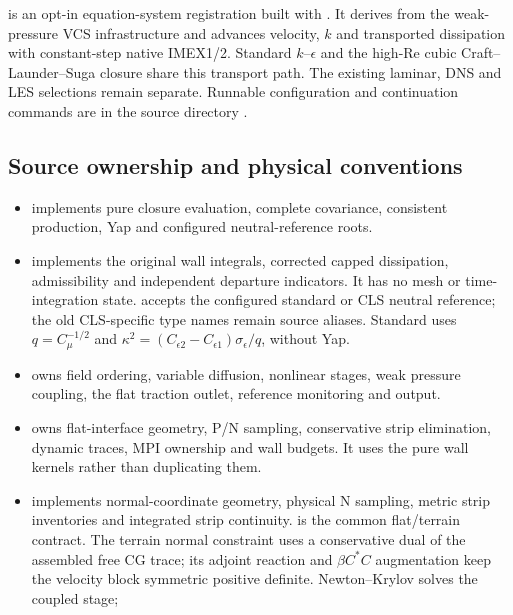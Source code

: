  is an opt-in equation-system registration
built with . It derives from the weak-pressure VCS
infrastructure and advances velocity, $k$ and transported dissipation with
constant-step native IMEX1/2. Standard $k$--$\epsilon$ and the high-Re cubic
Craft--Launder--Suga closure share this transport path. The existing laminar,
DNS and LES selections remain separate. Runnable configuration and continuation
commands are in the source directory
.

\subsection{Source ownership and physical conventions}

\begin{itemize}
\item {} implements pure closure
evaluation, complete covariance, consistent production, Yap and configured
neutral-reference roots.
\item {} implements
the original wall integrals, corrected capped dissipation, admissibility and
independent departure indicators. It has no mesh or time-integration state.
 accepts the configured standard or CLS neutral
reference; the old CLS-specific type names remain source aliases. Standard
uses $q=C_\mu^{-1/2}$ and
$\kappa^2=(C_{\epsilon2}-C_{\epsilon1})\sigma_\epsilon/q$, without Yap.
\item {} owns field ordering, variable
diffusion, nonlinear stages, weak pressure coupling, the flat traction outlet,
reference monitoring and output.
\item {} owns flat-interface geometry, P/N
sampling, conservative strip elimination, dynamic traces, MPI ownership and
wall budgets. It uses the pure wall kernels rather than duplicating them.
\item {} implements normal-coordinate geometry,
physical N sampling, metric strip inventories and integrated strip continuity.
 is the common flat/terrain contract.
The terrain normal constraint uses a conservative dual of the assembled free
CG trace; its adjoint reaction and $\beta C^*C$ augmentation keep the velocity
block symmetric positive definite. Newton--Krylov solves the coupled stage;

\end{itemize}
